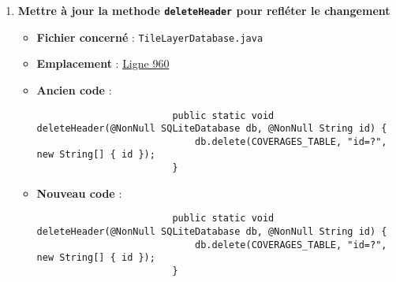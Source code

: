 \begin{enumerate}
    \item \textbf{Mettre à jour la methode \texttt{deleteHeader} pour refléter le changement}
          \begin{itemize}
              \item \textbf{Fichier concerné} : \texttt{TileLayerDatabase.java}
              \item \textbf{Emplacement} :
                    \href{https://github.com/MarcusWolschon/osmeditor4android/blob/master/src/main/java/de/blau/android/resources/TileLayerDatabase.java#L960 }{Ligne 960}
              \item \textbf{Ancien code} :
                    \begin{verbatim}
                        public static void deleteHeader(@NonNull SQLiteDatabase db, @NonNull String id) {
                            db.delete(COVERAGES_TABLE, "id=?", new String[] { id });
                        }
                    \end{verbatim}
              \item \textbf{Nouveau code} :
                    \begin{verbatim}
                        public static void deleteHeader(@NonNull SQLiteDatabase db, @NonNull String id) {
                            db.delete(COVERAGES_TABLE, "id=?", new String[] { id });
                        }
                \end{verbatim}
          \end{itemize}
\end{enumerate}